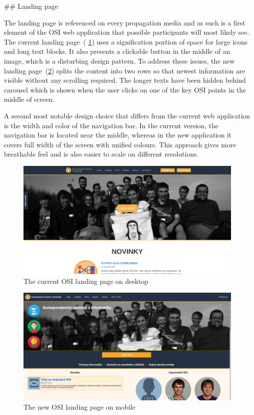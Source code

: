\documentclass[
  digital, %
  oneside, %
  lof,     %
  lot,     %
]{fithesis4}
\begin{document}
{## Landing page

The landing page is referenced on every propagation media and as such is a first element of the OSI web application that possible participants will most likely see. The current landing page~( \ref{fig:welcome-curr}) uses a signification portion of space for large icons and long text blocks. It also presents a clickable button in the middle of an image, which is a disturbing design pattern. To address these issues, the new landing page~(\ref{fig:welcome-new}) splits the content into two rows so that newest information are visible without any scrolling required. The longer texts have been hidden behind carousel which is shown when the user clicks on one of the key OSI points in the middle of screen.

A second most notable design choice that differs from the current web application is the width and color of the navigation bar. In the current version, the navigation bar is located near the middle, whereas in the new application it covers full width of the screen with unified colours. This approach gives more breathable feel and is also easier to scale on different resolutions.

\begin{figure}
\includegraphics[width=\textwidth]{assets/img/welcome_curr}
\caption{The current OSI landing page on desktop}
\label{fig:welcome-curr}
\end{figure}

\begin{figure}
\includegraphics[width=\textwidth]{assets/img/welcome_new}
\caption{The new OSI landing page on mobile}
\label{fig:welcome-new}
\end{figure}

}
\end{document}
